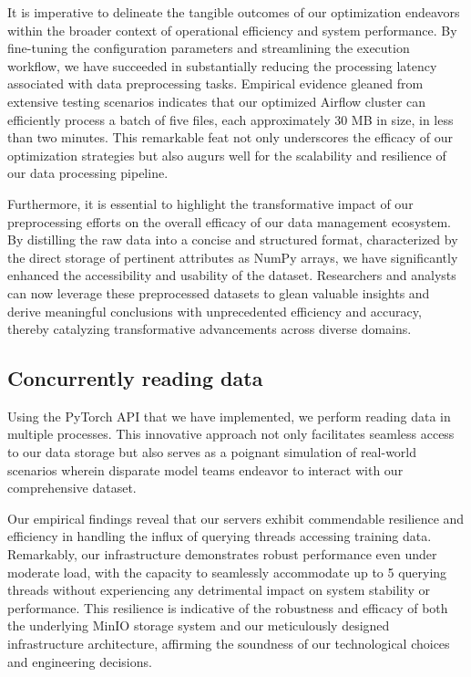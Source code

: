 It is imperative to delineate the tangible outcomes of our optimization
endeavors within the broader context of operational efficiency and system
performance. By fine-tuning the configuration parameters and streamlining the
execution workflow, we have succeeded in substantially reducing the processing
latency associated with data preprocessing tasks. Empirical evidence gleaned
from extensive testing scenarios indicates that our optimized Airflow cluster
can efficiently process a batch of five files, each approximately 30 MB in size,
in less than two minutes. This remarkable feat not only underscores the efficacy
of our optimization strategies but also augurs well for the scalability and
resilience of our data processing pipeline.

Furthermore, it is essential to highlight the transformative impact of our
preprocessing efforts on the overall efficacy of our data management ecosystem.
By distilling the raw data into a concise and structured format, characterized
by the direct storage of pertinent attributes as NumPy arrays, we have
significantly enhanced the accessibility and usability of the dataset.
Researchers and analysts can now leverage these preprocessed datasets to glean
valuable insights and derive meaningful conclusions with unprecedented
efficiency and accuracy, thereby catalyzing transformative advancements across
diverse domains.


\subsection{Concurrently reading data}
Using the PyTorch API that we have implemented, we perform reading data in
multiple processes. This innovative approach not only facilitates seamless
access to our data storage but also serves as a poignant simulation of
real-world scenarios wherein disparate model teams endeavor to interact with our
comprehensive dataset.

Our empirical findings reveal that our servers exhibit commendable resilience
and efficiency in handling the influx of querying threads accessing training
data. Remarkably, our infrastructure demonstrates robust performance even under
moderate load, with the capacity to seamlessly accommodate up to 5 querying
threads without experiencing any detrimental impact on system stability or
performance. This resilience is indicative of the robustness and efficacy of
both the underlying MinIO storage system and our meticulously designed
infrastructure architecture, affirming the soundness of our technological
choices and engineering decisions.

